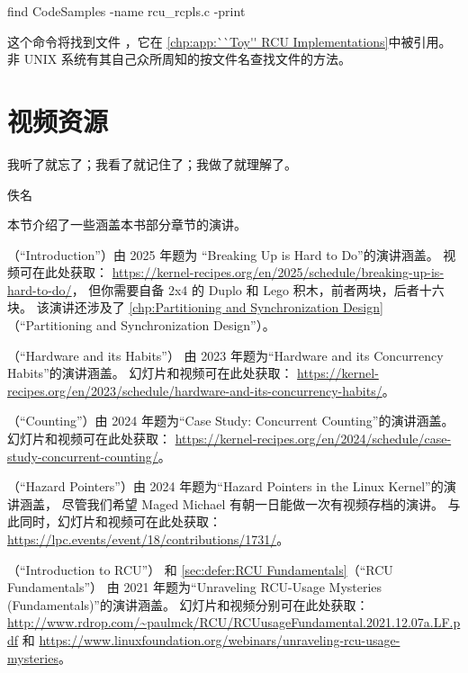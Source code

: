 \begin{VerbatimU}
find CodeSamples -name rcu_rcpls.c -print
\end{VerbatimU}

这个命令将找到文件 ，它在
\cref{chp:app:``Toy'' RCU Implementations}中被引用。
非 UNIX 系统有其自己众所周知的按文件名查找文件的方法。

\section{视频资源}
\label{sec:howto:Video Resources}
%
\epigraph{我听了就忘了；我看了就记住了；我做了就理解了。}
	 {佚名}

本节介绍了一些涵盖本书部分章节的演讲。

（``Introduction''）由 2025 年题为
``Breaking Up is Hard to Do''的演讲涵盖。
视频可在此处获取：
\url{https://kernel-recipes.org/en/2025/schedule/breaking-up-is-hard-to-do/}，
但你需要自备 2x4 的 Duplo 和 Lego 积木，前者两块，后者十六块。
该演讲还涉及了
\cref{chp:Partitioning and Synchronization Design}
（``Partitioning and Synchronization Design''）。

（``Hardware and its Habits''）
由 2023 年题为``Hardware and its Concurrency Habits''的演讲涵盖。
幻灯片和视频可在此处获取：
\url{https://kernel-recipes.org/en/2023/schedule/hardware-and-its-concurrency-habits/}。

（``Counting''）由 2024 年题为``Case Study:
Concurrent Counting''的演讲涵盖。
幻灯片和视频可在此处获取：
\url{https://kernel-recipes.org/en/2024/schedule/case-study-concurrent-counting/}。

（``Hazard Pointers''）由
2024 年题为``Hazard Pointers in the Linux Kernel''的演讲涵盖，
尽管我们希望 Maged Michael 有朝一日能做一次有视频存档的演讲。
与此同时，幻灯片和视频可在此处获取：
\url{https://lpc.events/event/18/contributions/1731/}。

（``Introduction to RCU''）
和
\cref{sec:defer:RCU Fundamentals}（``RCU Fundamentals''）
由 2021 年题为``Unraveling RCU-Usage Mysteries
(Fundamentals)''的演讲涵盖。
幻灯片和视频分别可在此处获取：
\url{http://www.rdrop.com/~paulmck/RCU/RCUusageFundamental.2021.12.07a.LF.pdf}
和
\url{https://www.linuxfoundation.org/webinars/unraveling-rcu-usage-mysteries}。

